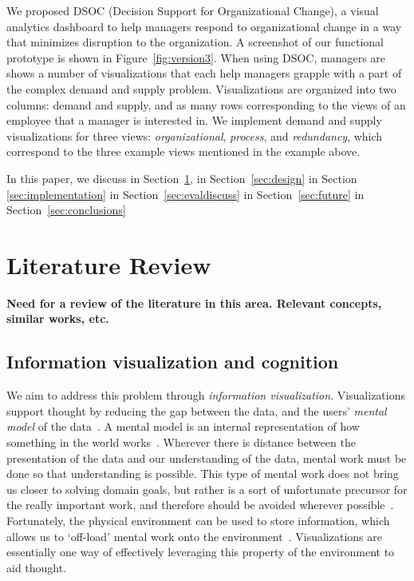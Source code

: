 \documentclass[journal]{vgtc}                %
\begin{document}
We proposed DSOC (Decision Support for Organizational Change), a visual analytics dashboard to help managers respond to organizational change in a way that minimizes disruption to the organization. A screenshot of our functional prototype is shown in Figure~\ref{fig:version3}. When using DSOC, managers are shows a number of visualizations that each help managers grapple with a part of the complex demand and supply problem. Visualizations are organized into two columns: demand and supply, and as many rows corresponding to the views of an employee that a manager is interested in. We implement demand and supply visualizations for three views: \emph{organizational}, \emph{process}, and \emph{redundancy}, which correspond to the three example views mentioned in the example above. 

In this paper, we discuss \textellipsis in Section~\ref{sec:litreview}, \textellipsis in Section~\ref{sec:design} \textellipsis in Section \ref{sec:implementation} \textellipsis in Section~\ref{sec:evaldiscuss} \textellipsis in Section~\ref{sec:future} \textellipsis in Section~\ref{sec:conclusions}

\section{Literature Review}
\label{sec:litreview}

\textbf{{\color{Plum}Need for a review of the literature in this area. Relevant concepts, similar works, etc.
}}

\subsection{Information visualization and cognition}

We aim to address this problem through \emph{information visualization}. Visualizations support thought by reducing the gap between the data, and the users' \emph{mental model} of the data~\cite{yi2007toward}. A mental model is an internal representation of how something in the world works~\cite{staggersmodel,norman2014some}. Wherever there is distance between the presentation of the data and our understanding of the data, mental work must be done so that understanding is possible. This type of mental work does not bring us closer to solving domain goals, but rather is a sort of unfortunate precursor for the really important work, and therefore should be avoided wherever possible~\cite{paas2003cognitive}. Fortunately, the physical environment can be used to store information, which allows us to \lq off-load\rq{} mental work onto the environment~\cite{wilson2002six}. Visualizations are essentially one way of effectively leveraging this property of the environment to aid thought.
\end{document}
